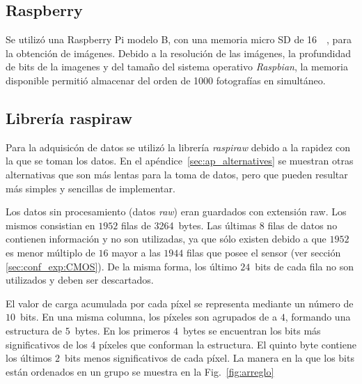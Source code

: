 \documentclass[twoside,twocolumn]{article}
\begin{document}
    \subsection{Raspberry}\label{sec:conf_exp:raspberry}
      Se utilizó una Raspberry Pi modelo B, con una memoria micro SD de \SI{16}{\giga\byte}, para la obtención de imágenes.
      Debido a la resolución de las imágenes, la profundidad de bits de la imagenes y del tamaño del sistema operativo \emph{Raspbian}, 
      la memoria disponible permitió almacenar del orden de 1000 fotografías en simultáneo.

    \subsection{Librería raspiraw}\label{sec:conf_exp:raspiraw}
      Para la adquisicón de datos se utilizó la librería {\it raspiraw}\cite{raspiraw} debido a la rapidez con la que se toman los datos.
      En el apéndice~\ref{sec:ap_alternatives} se muestran otras alternativas que son más lentas para la toma de datos,
      pero que pueden resultar más simples y sencillas de implementar.

      Los datos sin procesamiento (datos \emph{raw}) eran guardados con extensión raw.
      Los mismos consistian en $1952$ filas de 3264~bytes.
      Las últimas $8$ filas de datos no contienen información y no son utilizadas,
      ya que sólo existen debido a que $1952$ es menor múltiplo de $16$
      mayor a las $1944$ filas que posee el sensor (ver sección \ref{sec:conf_exp:CMOS}).
      De la misma forma, los último $24$~bits de cada fila no son utilizados y deben ser descartados.

      El valor de carga acumulada por cada píxel se representa mediante un número de $10$~bits.
      En una misma columna, los píxeles son agrupados de a $4$, formando una estructura de $5$~bytes.
      En los primeros $4$~bytes se encuentran los bits más significativos de los 4 píxeles que conforman la estructura.
      El quinto byte contiene los últimos $2$~bits menos significativos de cada píxel.\cite{picamera}
      La manera en la que los bits están ordenados en un grupo se muestra en la Fig.~\ref{fig:arreglo}
\end{document}
